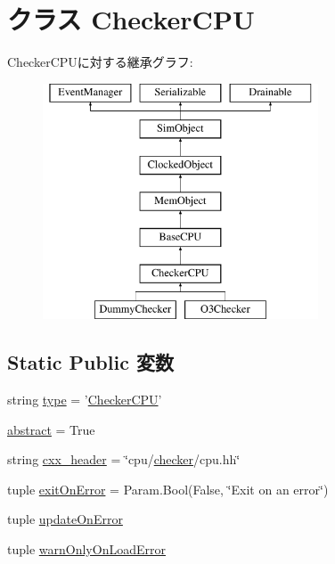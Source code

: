 \hypertarget{classCheckerCPU_1_1CheckerCPU}{
\section{クラス CheckerCPU}
\label{classCheckerCPU_1_1CheckerCPU}
}
CheckerCPUに対する継承グラフ:\begin{figure}[H]
\begin{center}
\leavevmode
\includegraphics[height=7cm]{classCheckerCPU_1_1CheckerCPU}
\end{center}
\end{figure}
\subsection*{Static Public 変数}
\begin{DoxyCompactItemize}
\item 
string \hyperlink{classCheckerCPU_1_1CheckerCPU_acce15679d830831b0bbe8ebc2a60b2ca}{type} = '\hyperlink{classCheckerCPU_1_1CheckerCPU}{CheckerCPU}'
\item 
\hyperlink{classCheckerCPU_1_1CheckerCPU_a17fa61ac3806b481cafee5593b55e5d0}{abstract} = True
\item 
string \hyperlink{classCheckerCPU_1_1CheckerCPU_a17da7064bc5c518791f0c891eff05fda}{cxx\_\-header} = \char`\"{}cpu/\hyperlink{classBaseCPU_ad79de7771e2fdfe4aa9ba3d4f7e6972c}{checker}/cpu.hh\char`\"{}
\item 
tuple \hyperlink{classCheckerCPU_1_1CheckerCPU_ae3f9ab8da88c7ebfba47692201291bed}{exitOnError} = Param.Bool(False, \char`\"{}Exit on an error\char`\"{})
\item 
tuple \hyperlink{classCheckerCPU_1_1CheckerCPU_aad41d3eb2d73f3e7035d73c73bf92523}{updateOnError}
\item 
tuple \hyperlink{classCheckerCPU_1_1CheckerCPU_a2c725933b14b9d3c867f1ab31a36274e}{warnOnlyOnLoadError}
\end{DoxyCompactItemize}


